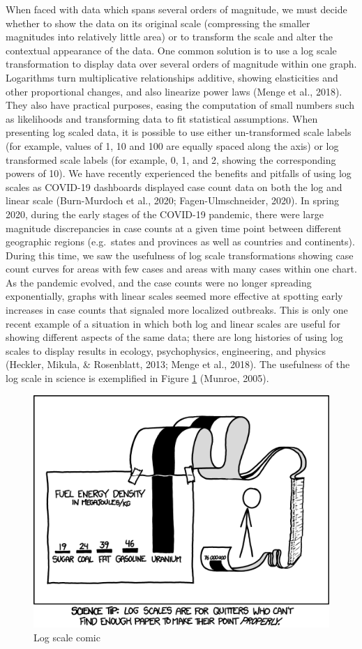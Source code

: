 \documentclass[print]{nuthesis}
\begin{document}
When faced with data which spans several orders of magnitude, we must decide whether to show the data on its original
scale (compressing the smaller magnitudes into relatively little area) or to transform the scale and alter the contextual appearance of the data.
One common solution is to use a log scale transformation to display data over several orders of magnitude within one graph.
Logarithms turn multiplicative relationships additive, showing elasticities and other proportional changes, and also linearize power laws (Menge et al., 2018).
They also have practical purposes, easing the computation of small numbers such as likelihoods and transforming data to fit statistical assumptions.
When presenting log scaled data, it is possible to use either un-transformed scale labels (for example, values of 1, 10 and 100 are equally spaced along the axis) or log transformed scale labels (for example, 0, 1, and 2, showing the corresponding powers of 10).
We have recently experienced the benefits and pitfalls of using log scales as COVID-19 dashboards displayed
case count data on both the log and linear scale (Burn-Murdoch et al., 2020; Fagen-Ulmschneider, 2020). In spring 2020, during the early stages of the COVID-19 pandemic, there were large magnitude discrepancies in case counts at a given time point between different geographic regions (e.g.~states and provinces as well as countries and continents).
During this time, we saw the usefulness of log scale transformations showing case count curves for areas with few cases and areas with many cases within one chart.
As the pandemic evolved, and the case counts were no longer spreading exponentially, graphs with linear scales seemed more effective at spotting early increases in case counts that signaled more localized outbreaks.
This is only one recent example of a situation in which both log and linear scales are useful for showing different aspects of the same data; there are long histories of using log scales to display results in ecology, psychophysics, engineering, and physics (Heckler, Mikula, \& Rosenblatt, 2013; Menge et al., 2018). The usefulness of the log scale in science is exemplified in Figure \ref{fig:log-scale-comic} (Munroe, 2005).

\begin{figure}

{\centering \includegraphics[width=0.7\linewidth]{images/log-scale-comic} 

}

\caption{Log scale comic}\label{fig:log-scale-comic}
\end{figure}
\end{document}
